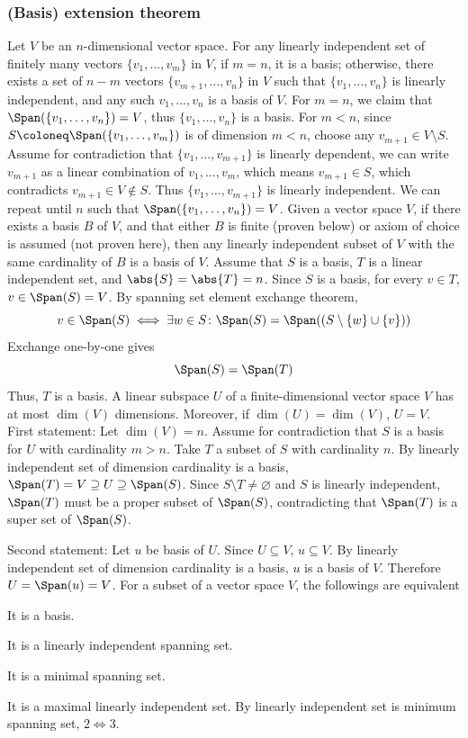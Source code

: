 \documentclass[a4paper,12pt]{report}
\begin{document}
\subsubsection{(Basis) extension theorem}
Let $V$ be an $n$-dimensional vector space. For any linearly independent set of finitely many vectors $\{v_1,\ldots,v_m\}$ in $V$, if $m=n$, it is a basis; otherwise, there exists a set of $n-m$ vectors $\{v_{m+1},\ldots,v_n\}$ in $V$ such that $\{v_1,\ldots,v_n\}$ is linearly independent, and any such $v_1,\ldots,v_n$ is a basis of $V$.
\bpr
For $m=n$, we claim that $\Span(\{v_1,\ldots,v_n\})=V$, thus $\{v_1,\ldots,v_n\}$ is a basis. For $m<n$, since $S\coloneq\Span(\{v_1,\ldots,v_m\})$ is of dimension $m<n$, choose any $v_{m+1}\in V\setminus S$. Assume for contradiction that $\{v_1,\ldots,v_{m+1}\}$ is linearly dependent, we can write $v_{m+1}$ as a linear combination of $v_1,\ldots,v_m$, which means $v_{m+1}\in S$, which contradicts $v_{m+1}\in V\notin S$. Thus $\{v_1,\ldots,v_{m+1}\}$ is linearly independent. We can repeat until $n$ such that $\Span(\{v_1,\ldots,v_n\})=V$.
\epr
{}
Given a vector space $V$, if there exists a basis $B$ of $V$, and that either $B$ is finite (proven below) or axiom of choice is assumed (not proven here), then any linearly independent subset of $V$ with the same cardinality of $B$ is a basis of $V$.
\bpr
Assume that $S$ is a basis, $T$ is a linear independent set, and $\abs{S}=\abs{T}=n$. Since $S$ is a basis, for every $v\in T$, $v\in\Span(S)=V$. By spanning set element exchange theorem,
\[v\in\Span(S)\iff\exists w\in S\colon\Span(S)=\Span((S\setminus\{w\}\cup\{v\}))\]
Exchange one-by-one gives
\[\Span(S)=\Span(T)\]
Thus, $T$ is a basis.
\epr
{}
A linear subspace $U$ of a finite-dimensional vector space $V$ has at most $\dim(V)$ dimensions. Moreover, if $\dim(U)=\dim(V)$, $U=V$.
\bpr
First statement: Let $\dim(V)=n$. Assume for contradiction that $S$ is a basis for $U$ with cardinality $m>n$. Take $T$ a subset of $S$ with cardinality $n$. By linearly independent set of dimension cardinality is a basis, $\Span(T)=V\supseteq U\supseteq\Span(S)$. Since $S\setminus T\ne\varnothing$ and $S$ is linearly independent, $\Span(T)$ must be a proper subset of $\Span(S)$, contradicting that $\Span(T)$ is a super set of $\Span(S)$.

Second statement: Let $u$ be basis of $U$. Since $U\subseteq V$, $u\subseteq V$. By linearly independent set of dimension cardinality is a basis, $u$ is a basis of $V$. Therefore $U=\Span(u)=V$.
\epr
{}
For a subset of a vector space $V$, the followings are equivalent
\ben
\item It is a basis.
\item It is a linearly independent spanning set.
\item It is a minimal spanning set.
\item It is a maximal linearly independent set.
\een
\bpr
By linearly independent set is minimum spanning set, $2\iff 3$.
\end{document}
